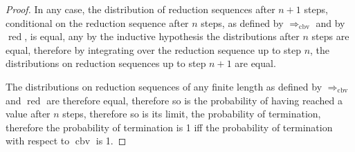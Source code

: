 \documentclass{article}
\DeclareMathOperator{\red}{red}
\DeclareMathOperator{\cbv}{cbv}
\theoremstyle{definition}
\theoremstyle{lemma}
\theoremstyle{remark}
\begin{document}
\begin{proof}
In any case, the distribution of reduction sequences after $n+1$ steps, conditional on the reduction sequence after $n$ steps, as defined by $\Rightarrow_{\cbv}$ and by $\red$, is equal, any by the inductive hypothesis the distributions after $n$ steps are equal, therefore by integrating over the reduction sequence up to step $n$, the distributions on reduction sequences up to step $n+1$ are equal.

The distributions on reduction sequences of any finite length as defined by $\Rightarrow_{\cbv}$ and $\red$ are therefore equal, therefore so is the probability of having reached a value after $n$ steps, therefore so is its limit, the probability of termination, therefore the probability of termination is 1 iff the probability of termination with respect to $\cbv$ is 1.
\end{proof}
\end{document}

